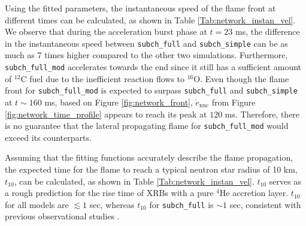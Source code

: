 \documentclass[preprint,times,tighten]{aastex631}
\begin{document}
Using the fitted parameters, the instantaneous speed of the flame front at different times can be calculated, as shown in Table \ref{Tab:network_instan_vel}. We observe that during the acceleration burst phase at $t = 23$ ms, the difference in the instantaneous speed between {\tt subch\_full} and {\tt subch\_simple} can be as much as 7 times higher compared to the other two simulations. Furthermore, {\tt subch\_full\_mod} accelerates towards the end since it still has a sufficient amount of ${}^{12}$C fuel due to the inefficient reaction flows to ${}^{16}$O. Even though the flame front for {\tt subch\_full\_mod} is expected to surpass {\tt subch\_full} and {\tt subch\_simple} at $t \sim 160$ ms, based on Figure \ref{fig:network_front}, $\dot{e}_{\textrm{nuc}}$ from Figure \ref{fig:network_time_profile} appears to reach its peak at $120$ ms. Therefore, there is no guarantee that the lateral propagating flame for {\tt subch\_full\_mod} would exceed its counterparts. 

Assuming that the fitting functions accurately describe the flame propagation, the expected time for the flame to reach a typical neutron star radius of 10 km, $t_{10}$, can be calculated, as shown in Table \ref{Tab:network_instan_vel}. $t_{10}$ serves as a rough prediction for the rise time of XRBs with a pure ${}^{4}$He accretion layer. $t_{10}$ for all models are $\lesssim 1$ sec, whereas $t_{10}$ for {\tt subch\_full} is $\sim 1$ sec, consistent with previous observational studies \citep{galloway:2008}.


\begin{comment}
\begin{figure*}
\centering
\plotone{integration_wallclock.pdf}
\caption{\label{fig:wallclock_time} Wallclock time used per simulation time as function of simulation time. Wallclock time analysis is only conducted for $t > 40$ ms as some simulation models used CPU while others used GPU for $t < 40$ ms.}
\end{figure*}

In order to give an overview of the computational expenses needed for each simulation models, Figure \ref{fig:wallclock_time} shows the wallclock time used per simulation time as a function of simulation time for all models. As some models utilized CPU while others used GPU for $t < 40$ ms, a wallclock time analysis fails to provide an accurate estimate of the computational expenses incurred by each model for during this time frame. Therefore, we have limited the presentation of our data to $t > 40$ ms. The results indicate that the four simulation models, which differ only in terms of their reaction networks, exhibit the expected trends. Specifically, the simulation model with the smallest network, {\tt aprox13}, that has the fewest isotopes and reaction rates requires the least amount of wallclock hours for $1$ ms of simulation time. Conversely, the largest network, {\tt subch\_full}, requires $\sim 3-4$ times the wallclock time needed by {\tt aprox13} to complete the same simulation. Notably, the computational cost for {\tt subch\_full\_mod} gradually increases over time, ultimately exceeding {\tt subch\_full}.

\end{comment}
\end{document}
